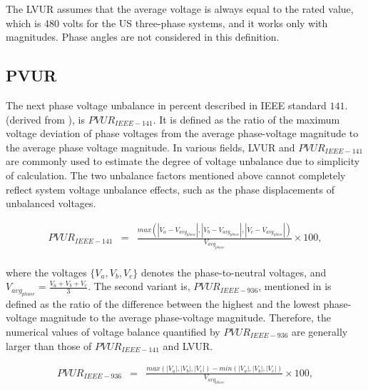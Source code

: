 		The LVUR assumes that the average voltage is always equal to the rated value, which is 480 volts for the US three-phase systems, and it works only with magnitudes. Phase angles are not considered in this definition.
	
	\subsection{PVUR}
	
	The next phase voltage unbalance in percent described in IEEE standard $141.$ \cite{IEEE_141_35071} (derived from \cite{IEEE_112_8635630}), is $PVUR_{IEEE-141}$. It is defined as the ratio of the maximum voltage deviation of phase voltages from the average phase-voltage magnitude to the average phase voltage magnitude. In various fields, LVUR and $PVUR_{IEEE-141}$ are commonly used to estimate the degree of voltage unbalance due to simplicity of calculation. The two unbalance factors mentioned above cannot completely reflect system voltage unbalance effects, such as the phase displacements of unbalanced voltages.
	
	\begin{equation}
        \begin{array}{rcl}
            PVUR_{IEEE-141}&=&\frac{max\left( |V_{a}-V_{avg_{phase}}|,|V_{b}-V_{avg_{phase}}|,|V_{c}-V_{avg_{phase}}| \right)}{V_{avg_{phase}}}\times100,\\
        \end{array}
        \label{BASICUNB:equ:PVUR-141}
    \end{equation}

where the voltages $\{V_{a},V_{b},V_{c}\}$ denotes the phase-to-neutral voltages, and $V_{avg_{phase}}=\frac{V_{a}+V_{b}+V_{c}}{3}$.
The second variant is, $PVUR_{IEEE-936}$, mentioned in \cite{IEEE_936_29053} is defined as the ratio of the difference between the highest and the lowest phase-voltage magnitude to the average phase-voltage magnitude. Therefore, the numerical values of voltage balance quantified by $PVUR_{IEEE-936}$ are generally larger than those of $PVUR_{IEEE-141}$ and LVUR. 

\begin{equation}
        \begin{array}{rcl}
            PVUR_{IEEE-936}&=&\frac{max\left( |V_a|,|V_b|,|V_c| \right)-min\left( |V_a|,|V_b|,|V_c| \right)}{V_{avg_{phase}}}\times100,\\					
        \end{array}
        \label{BASICUNB:equ:PVUR141}
    \end{equation}
		
